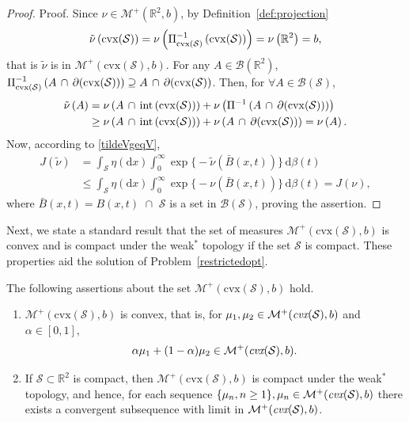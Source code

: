 \documentclass[stsy,sglanonrev]{informs4}
\newcommand{\death}{{\beta}}
\begin{document}
\begin{proof}{Proof.}
Since $\nu \in \mathcal{M}^+(\mathbb{R}^2,b)$, by Definition~\ref{def:projection}  \begin{equation*}
     \tilde{\nu}\left(\rm{cvx}(\mathcal{S})\right) = \nu\left(\Pi^{-1}_{\rm{cvx}(\mathcal{S})}\left(\rm{cvx}(\mathcal{S})\right)\right)=\nu\left(\mathbb{R}^2 \right)=b,
\end{equation*} that is $\tilde{\nu}$ is in $\mathcal{M}^+(\mbox{cvx}(\mathcal{S}),b)$. For any $ A \in \mathcal{B}(\mathbb{R}^2)$, $\Pi^{-1}_{\rm{cvx}(\mathcal{S})}\left(A \, \cap \, \partial(\rm{cvx}(\mathcal{S}))\right) \supseteq A \, \cap \, \partial(\rm{cvx}(\mathcal{S}))$.
Then, for $\forall A \in \mathcal{B}(\mathcal{S})$,
\begin{align} \label{tildeVgeqV}
    \tilde{\nu}\left(A \right)&=\nu\left(A \, \cap \, \rm{int}\left(\rm{cvx}(\mathcal{S})\right)\right) +  \nu\left(\Pi^{-1}\left(A \, \cap \, \partial(\rm{cvx}(\mathcal{S}))\right)\right) \nonumber \\ &\geq \nu\left(A \, \cap \, \rm{int}\left(\rm{cvx}(\mathcal{S})\right)\right) +  \nu\left(A \, \cap \, \partial(\rm{cvx}(\mathcal{S}))\right) = \nu\left(A \right).
\end{align}
Now, according to \eqref{tildeVgeqV},
\begin{align*}
    J(\tilde{\nu})& =\int_{\mathcal{S}} \eta(\mbox{d}x) \int_0^{\infty} \exp\Big\{-\tilde{\nu}(\bar{B}(x,t))\Big\} \, \mbox{d}\death(t) \\ & \le \int_{\mathcal{S}} \eta(\mbox{d}x) \int_0^{\infty} \exp\Big\{-\nu(\bar{B}(x,t))\Big\} \, \mbox{d}\death(t) = J(\nu),
\end{align*}
where $\bar{B}(x,t)= B(x,t) \,\, \cap \,\, \mathcal{S}$ is a set in $ \mathcal{B}(\mathcal{S})$, proving the assertion.   \hfill \Halmos
\end{proof}

Next, we state a standard result that the set of measures $\mathcal{M}^+(\mathrm{cvx}(\mathcal{S}), b)$ is convex and is compact under the weak$^*$ topology if the set $\mathcal{S}$ is compact. These properties aid the solution of Problem~\eqref{restrictedopt}. 

\begin{theorem}\label{thm:feasibleregion}  The following assertions about the set $\mathcal{M}^+(\mbox{cvx}(\mathcal{S}),b)$ hold. \begin{enumerate} \item[(a)] $\mathcal{M}^+(\mbox{cvx}(\mathcal{S}),b)$ is convex, that is, for $\mu_1, \mu_2 \in \mathcal{M}^+(\emph{\mbox{cvx}}(\mathcal{S}),b)$ and $\alpha \in [0,1]$, $$\alpha \mu_1 + (1-\alpha)\mu_2 \in \mathcal{M}^+(\emph{\mbox{cvx}}(\mathcal{S}),b).$$ \item[(b)] If $\mathcal{S} \subset \mathbb{R}^2$ is compact, then $\mathcal{M}^+(\mbox{cvx}(\mathcal{S}),b)$ is compact under the weak$^*$ topology, and hence, for each sequence $\{\mu_n, n \geq 1\}, \mu_n \in \mathcal{M}^+(\emph{\mbox{cvx}}(\mathcal{S}),b)$ there exists a convergent subsequence with limit in $\mathcal{M}^+(\emph{\mbox{cvx}}(\mathcal{S}),b)$.\end{enumerate}
\end{theorem}
\end{document}
